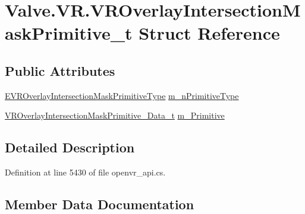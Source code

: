 \hypertarget{struct_valve_1_1_v_r_1_1_v_r_overlay_intersection_mask_primitive__t}{}\section{Valve.\+V\+R.\+V\+R\+Overlay\+Intersection\+Mask\+Primitive\+\_\+t Struct Reference}
\label{struct_valve_1_1_v_r_1_1_v_r_overlay_intersection_mask_primitive__t}
\subsection*{Public Attributes}
\begin{DoxyCompactItemize}
\item 
\mbox{\hyperlink{namespace_valve_1_1_v_r_a05602250e6a175887b78fb2e83121abc}{E\+V\+R\+Overlay\+Intersection\+Mask\+Primitive\+Type}} \mbox{\hyperlink{struct_valve_1_1_v_r_1_1_v_r_overlay_intersection_mask_primitive__t_a229ee4ccf8011048735f430dd1380878}{m\+\_\+n\+Primitive\+Type}}
\item 
\mbox{\hyperlink{struct_valve_1_1_v_r_1_1_v_r_overlay_intersection_mask_primitive___data__t}{V\+R\+Overlay\+Intersection\+Mask\+Primitive\+\_\+\+Data\+\_\+t}} \mbox{\hyperlink{struct_valve_1_1_v_r_1_1_v_r_overlay_intersection_mask_primitive__t_a96459ae33ae41806b0345893ded69be5}{m\+\_\+\+Primitive}}
\end{DoxyCompactItemize}


\subsection{Detailed Description}


Definition at line 5430 of file openvr\+\_\+api.\+cs.



\subsection{Member Data Documentation}
\mbox{\label{struct_valve_1_1_v_r_1_1_v_r_overlay_intersection_mask_primitive__t_a229ee4ccf8011048735f430dd1380878}} 
